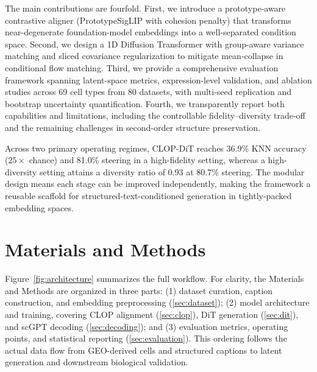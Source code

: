 The main contributions are fourfold. First, we introduce a prototype-aware contrastive aligner (PrototypeSigLIP with cohesion penalty) that transforms near-degenerate foundation-model embeddings into a well-separated condition space. Second, we design a 1D Diffusion Transformer with group-aware variance matching and sliced covariance regularization to mitigate mean-collapse in conditional flow matching. Third, we provide a comprehensive evaluation framework spanning latent-space metrics, expression-level validation, and ablation studies across 69 cell types from 80 datasets, with multi-seed replication and bootstrap uncertainty quantification. Fourth, we transparently report both capabilities and limitations, including the controllable fidelity--diversity trade-off and the remaining challenges in second-order structure preservation.

Across two primary operating regimes, CLOP-DiT reaches 36.9\% KNN accuracy ($25\times$ chance) and 81.0\% steering in a high-fidelity setting, whereas a high-diversity setting attains a diversity ratio of 0.93 at 80.7\% steering. The modular design means each stage can be improved independently, making the framework a reusable scaffold for structured-text-conditioned generation in tightly-packed embedding spaces.

\section{Materials and Methods}

Figure~\ref{fig:architecture} summarizes the full workflow. For clarity, the Materials and Methods are organized in three parts: (1) dataset curation, caption construction, and embedding preprocessing (\ref{sec:dataset}); (2) model architecture and training, covering CLOP alignment (\ref{sec:clop}), DiT generation (\ref{sec:dit}), and scGPT decoding (\ref{sec:decoding}); and (3) evaluation metrics, operating points, and statistical reporting (\ref{sec:evaluation}). This ordering follows the actual data flow from GEO-derived cells and structured captions to latent generation and downstream biological validation.

